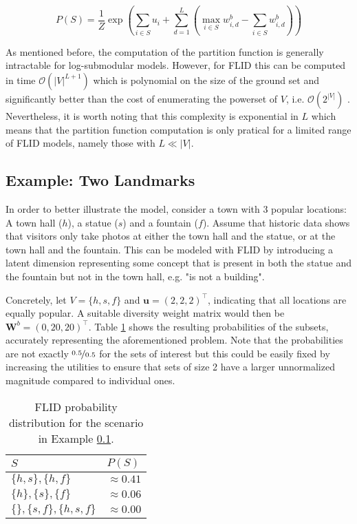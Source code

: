 \begin{equation}
  \tag{FLID}
  P(S) = \frac{1}{Z}\exp{\left(\sum_{i \in S}u_{i} + \sum_{d=1}^{L}\left(\max_{i \in S}{w^{b}_{i, d}} - \sum_{i \in S}{w^{b}_{i,d}}\right)\right)}
  \label{eq:flid}
\end{equation}

As mentioned before, the computation of the partition function is generally intractable for log-submodular models. However, for FLID this can be computed in time $\mathcal{O}(|V|^{L+1})$ which is polynomial on the size of the ground set and significantly better than the cost of enumerating the powerset of $V$, i.e. $\mathcal{O}(2^{|V|})$ \citep{tschiatschek16learning}. Nevertheless, it is worth noting that this complexity is exponential in $L$ which means that the partition function computation is only pratical for a limited range of FLID models, namely those with $L \ll |V|$.

\subsection{Example: Two Landmarks}
\label{sec:flid-toy}

In order to better illustrate the model, consider a town with 3 popular locations: A town hall ($h$), a statue ($s$) and a fountain ($f$). Assume that historic data shows that visitors only take photos at either the town hall and the statue, or at the town hall and the fountain. This can be modeled with FLID by introducing a latent dimension representing some concept that is present in both the statue and the fountain but not in the town hall, e.g. "is not a building".

Concretely, let $V = \{h, s, f\}$ and $\mathbf{u} = \left(2, 2, 2\right)^{\intercal}$, indicating that all locations are equally popular. A suitable diversity weight matrix would then be $\mathbf{W}^{b} = \left(0, 20, 20\right)^{\intercal}$. Table \ref{tab:flid-toy-probs} shows the resulting probabilities of the subsets, accurately representing the aforementioned problem. Note that the probabilities are not exactly $\nicefrac{0.5}{0.5}$ for the sets of interest but this could be easily fixed by increasing the utilities to ensure that sets of size 2 have a larger unnormalized magnitude compared to individual ones.

\begin{table}
  \centering
  \caption{FLID probability distribution for the scenario in Example \ref{sec:flid-toy}.}
  \begin{tabular}{@{}ll@{}}
    \toprule
    $S$ & $P(S)$  \\
    \midrule
    $\{h,s\}, \{h,f\}$ & $\approx 0.41$ \\
    $\{h\}, \{s\}, \{f\}$ & $\approx 0.06$ \\
    $\{\}, \{s,f\}, \{h,s,f\}$ & $\approx 0.00$ \\
    \bottomrule
  \end{tabular}
  \label{tab:flid-toy-probs}
\end{table}

